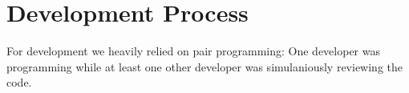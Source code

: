 \section{Development Process}
For development we heavily relied on pair programming: One developer was programming while at least one other developer was simulaniously reviewing the code.